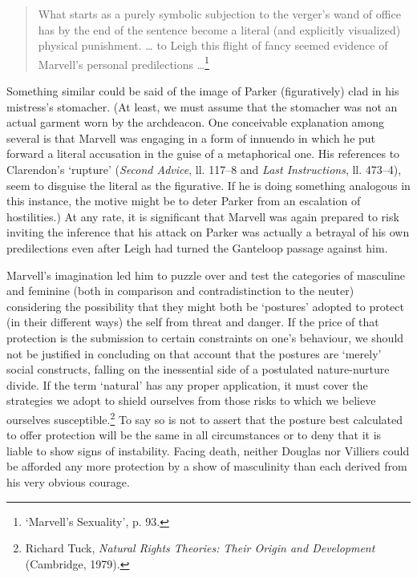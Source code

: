 ﻿\documentclass[12pt]{article}
\newcommand{\citedtitle}[1]{\textit{#1}}
\begin{document}
\begin{quote}
What starts as a purely symbolic subjection to the verger’s wand of office has by the
end of the sentence become a literal (and explicitly visualized) physical punishment. … to Leigh this flight of fancy seemed evidence of Marvell’s personal predilections …\footnote{‘Marvell’s Sexuality’, p. 93.}
\end{quote}
Something similar could be said of the image of Parker (figuratively) clad in his
mistress’s stomacher. (At least, we must assume that the stomacher was not an
actual garment worn by the archdeacon. One conceivable explanation among
several is that Marvell was engaging in a form of innuendo in which he put
forward a literal accusation in the guise of a metaphorical one. His references
to Clarendon’s ‘rupture’ (\citedtitle{Second Advice}, ll. 117–8 and \citedtitle{Last
Instructions},
ll. 473–4), seem to disguise the literal as the figurative. If he is doing
something analogous in this instance, the motive might be to deter Parker from
an escalation of hostilities.) At any rate, it is significant that Marvell was
again prepared to risk inviting the inference that his attack on Parker was
actually a betrayal of his own predilections even after Leigh had turned the
Ganteloop passage against him.

Marvell’s
imagination led him to puzzle over and test the categories of masculine and
feminine (both in comparison and contradistinction to the neuter) considering
the possibility that they might both be ‘postures’ adopted to protect (in their
different ways) the self from threat and danger. If the price of that
protection is the submission to certain constraints on one’s behaviour, we
should not be justified in concluding on that account that the postures are
‘merely’ social constructs, falling on the inessential side of a postulated
nature-nurture divide. If the term ‘natural’ has any proper application, it
must cover the strategies we adopt to shield ourselves from those risks to
which we believe ourselves susceptible.\footnote{Richard Tuck, \citedtitle{Natural Rights Theories: Their Origin and Development} (Cambridge, 1979).}
To say so is not to assert that the posture best calculated to offer protection
will be the same in all circumstances or to deny that it is liable to show
signs of instability. Facing death, neither Douglas nor Villiers could be
afforded any more protection by a show of masculinity than each derived from
his very obvious courage.
\end{document}
